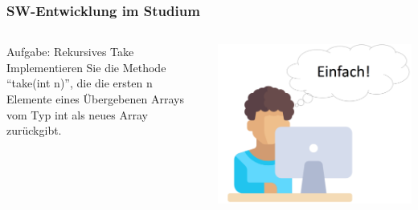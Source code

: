 \begin{frame}[fragile]
	\frametitle{SW-Entwicklung im Studium}
	\begin{columns}
		\begin{column}{.5\textwidth}
			Aufgabe: Rekursives Take
			\newline\newline
			Implementieren Sie die Methode ``take(int n)'', die
			die ersten n Elemente eines Übergebenen Arrays
			vom Typ int als neues Array zurückgibt.
		\end{column}
		\begin{column}{.5\textwidth}
			\center\includegraphics[width=1\textwidth,
			keepaspectratio=true]{bilder/student.png}
		\end{column}
	\end{columns}
\end{frame}

